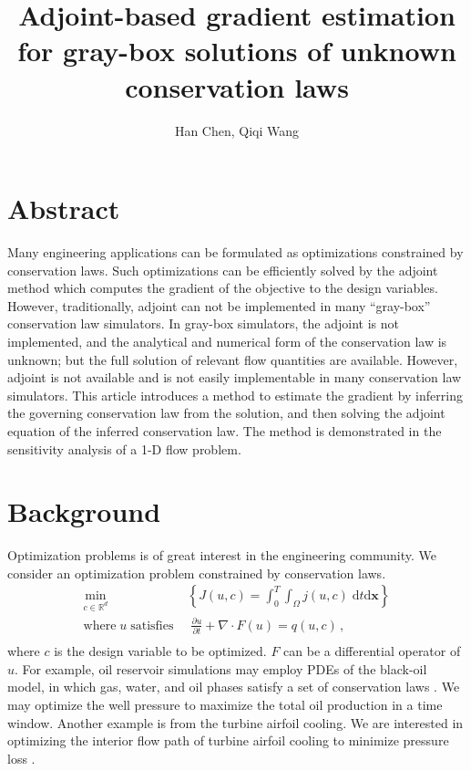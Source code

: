 \documentclass[a4paper,onecolumn]{article}
\theoremstyle{remark}
\begin{document}
\title{Adjoint-based gradient estimation for gray-box solutions of unknown conservation laws}
\author{Han Chen, Qiqi Wang}
\date{}
\maketitle
\section{Abstract}

\noindent
Many engineering applications can be formulated as optimizations constrained by conservation laws.
Such optimizations can be efficiently solved by the adjoint method which computes the gradient of
the objective to the design variables.
However, traditionally, adjoint can not be implemented in many ``gray-box'' conservation law 
simulators. In gray-box simulators, the adjoint is not implemented, and the analytical and numerical
form of the conservation law is unknown; but the full solution of relevant flow quantities are
available.
However, adjoint is not available and is not easily implementable in many conservation law simulators.
This article introduces a method to estimate the gradient by
inferring the governing conservation law from the solution, and then solving the adjoint equation of
the inferred conservation law.
The method is demonstrated in the sensitivity analysis of a 1-D flow problem.


\section{Background}
\label{background}
Optimization problems is of great interest in the engineering community. We consider an optimization problem
constrained by conservation laws.
\begin{equation}\begin{split}
    \min_{c\in\mathbb{R}^d} &\;\left\{ J(u,c)= \int_0^T\int_\Omega j(u,c) \; \textrm{d}t \textrm{d}\mathbf{x}\right\} \\
    \textrm{where}\; u\; \textrm{satisfies}& \;\; \frac{\partial u}{\partial t} + \nabla \cdot 
    F(u) =q(u,c)\,,\\
\end{split}\label{general opt}
\end{equation}
where $c$ is the design variable to be optimized. $F$ can be a differential operator of $u$.
For example, oil reservoir simulations may employ PDEs of the black-oil model, 
in which gas, water, and oil phases satisfy a set of conservation laws 
\cite{reservoir simulation book}. 
We may optimize the well pressure to maximize the total oil production in a time window.
Another example is from the turbine airfoil cooling. We are interested in optimizing the interior flow path
of turbine airfoil cooling to minimize pressure loss
\cite{ubend rans opt 1, ubend rans opt 2}.\\
\end{document}
